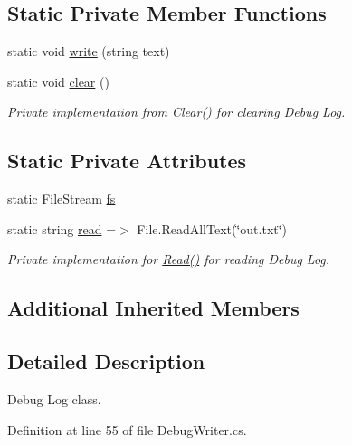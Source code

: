 \subsection*{Static Private Member Functions}
\begin{DoxyCompactItemize}
\item 
static void \mbox{\hyperlink{class_f_w_p_s_1_1_debug_writer_ae0d1317c605cc562554c3614071c6de3}{write}} (string text)
\item 
static void \mbox{\hyperlink{class_f_w_p_s_1_1_debug_writer_a95a1e4a53d8624dad174685ed12ebcb2}{clear}} ()
\begin{DoxyCompactList}\small\item\em Private implementation from \mbox{\hyperlink{class_f_w_p_s_1_1_debug_writer_ab34d96db0bb866e444604b733171519c}{Clear()}} for clearing Debug Log. \end{DoxyCompactList}\end{DoxyCompactItemize}
\subsection*{Static Private Attributes}
\begin{DoxyCompactItemize}
\item 
static File\+Stream \mbox{\hyperlink{class_f_w_p_s_1_1_debug_writer_a1b42179cea7cb765bacf1ec804e7e30f}{fs}}
\item 
static string \mbox{\hyperlink{class_f_w_p_s_1_1_debug_writer_a75b93784e256da1f4af6fa8ca66227d0}{read}} =$>$ File.\+Read\+All\+Text(\char`\"{}out.\+txt\char`\"{})
\begin{DoxyCompactList}\small\item\em Private implementation for \mbox{\hyperlink{class_f_w_p_s_1_1_debug_writer_a9d0c7fb6aaf43aaadda1a0a2b3780e57}{Read()}} for reading Debug Log. \end{DoxyCompactList}\end{DoxyCompactItemize}
\subsection*{Additional Inherited Members}


\subsection{Detailed Description}
Debug Log class. 

Definition at line 55 of file Debug\+Writer.\+cs.



